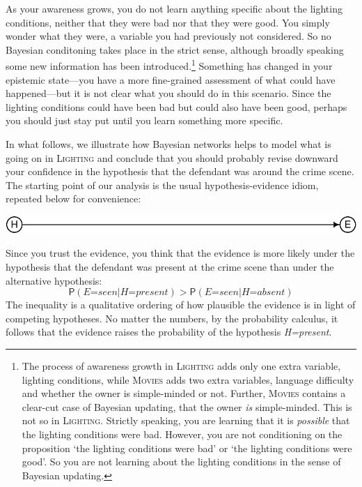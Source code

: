 \documentclass[
  11pt,
  dvipsnames,enabledeprecatedfontcommands]{scrartcl}
\newcommand{\pr}[1]{\ensuremath{\mathsf{P}(#1)}}
\begin{document}
As your awareness grows, you do not learn anything specific about the
lighting conditions, neither that they were bad nor that they were good.
You simply wonder what they were, a variable you had previously not
considered. So no Bayesian conditoning takes place in the strict sense,
although broadly speaking some new information has been
introduced.\footnote{The process of awareness growth in
  \textsc{Lighting} adds only one extra variable, lighting conditions,
  while \textsc{Movies} adds two extra variables, language difficulty
  and whether the owner is simple-minded or not. Further,
  \textsc{Movies} contains a clear-cut case of Bayesian updating, that
  the owner \emph{is} simple-minded. This is not so in
  \textsc{Lighting}. Strictly speaking, you are learning that it is
  \emph{possible} that the lighting conditions were bad. However, you
  are not conditioning on the proposition `the lighting conditions were
  bad' or `the lighting conditions were good'. So you are not learning
  about the lighting conditions in the sense of Bayesian updating.}
Something has changed in your epistemic state---you have a more
fine-grained assessment of what could have happened---but it is not
clear what you should do in this scenario. Since the lighting conditions
could have been bad but could also have been good, perhaps you should
just stay put until you learn something more specific.

In what follows, we illustrate how Bayesian networks helps to model what
is going on in \textsc{Lighting} and conclude that you should probably
revise downward your confidence in the hypothesis that the defendant was
around the crime scene. The starting point of our analysis is the usual
hypothesis-evidence idiom, repeated below for convenience:

\begin{center}\includegraphics[width=0.5\linewidth,height=0.5\textheight]{ReplyToSteeleStefansson5_files/figure-latex/heDAG-1} \end{center}

\noindent Since you trust the evidence, you think that the evidence is
more likely under the hypothesis that the defendant was present at the
crime scene than under the alternative hypothesis:
\[\pr{\textit{E=seen} \vert \textit{H=present}} > \pr{\textit{E=seen} \vert \textit{H=absent}}\]
The inequality is a qualitative ordering of how plausible the evidence
is in light of competing hypotheses. No matter the numbers, by the
probability calculus, it follows that the evidence raises the
probability of the hypothesis \textit{H=present}.
\end{document}
